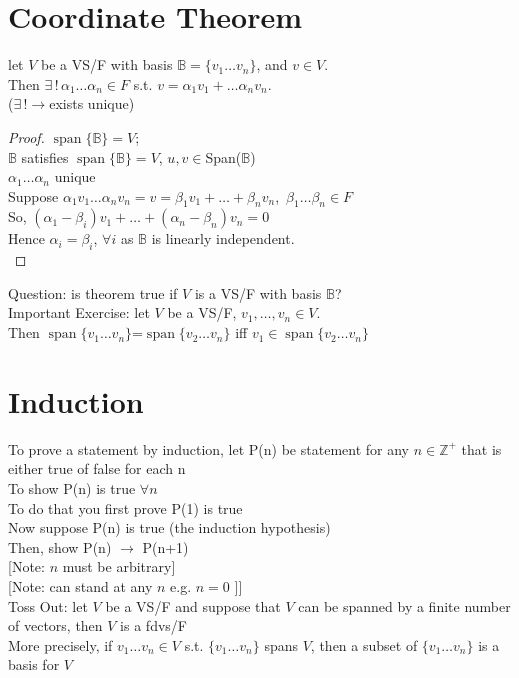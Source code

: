 \documentclass[11pt]{article}
\DeclareMathOperator{\Span}{span}
\begin{document}
\doublespacing
\section*{Coordinate Theorem}
let $V$ be a VS/F with basis $\mathbb{B}=\{v_1\ldots v_n\}$, and $v\in V$. \\
Then $\exists \,! \,{\alpha}_1\ldots {\alpha}_n\in F$ s.t. $v={\alpha}_1v_1+\ldots {\alpha}_nv_n$. \\
($\exists\,!\rightarrow$exists unique)\\
\begin{proof}
$\Span\{\mathbb{B}\}=V$;\\
$\mathbb{B}$ satisfies $\Span\{\mathbb{B} \}=V$, $u, v\in $Span($\mathbb{B}$)\\
$\alpha_1\ldots\alpha_n$ unique\\
Suppose 
${\alpha}_1v_1\ldots {\alpha}_nv_n=v=\beta_1v_1+\ldots+\beta_nv_n$, $\,\beta_1\ldots\beta_n\in F$\\
So, $({\alpha}_1-\beta_i)v_1+\ldots+({\alpha}_n-\beta_n)v_n=0$\\
Hence ${\alpha}_i=\beta_i$, $\forall i$ as $\mathbb{B}$ is linearly independent.\\
\end{proof}

Question: is theorem true if $V$ is a VS/F with basis $\mathbb{B}$?\\
Important Exercise: let $V$ be a VS/F, $v_1,\ldots, v_n\in V$. \\
Then $\Span\{v_1\ldots v_n\}$=$\Span\{v_2\ldots v_n\}$ iff $v_1\in \Span\{v_2\ldots v_n\}$\\

\section*{Induction}
To prove a statement by induction, let P(n) be statement for any $n\in \mathbb{Z}^+$ that is either true of false for each n\\
To show P(n) is true $\forall n$\\
To do that you first prove P(1) is true\\
Now suppose P(n) is true (the induction hypothesis)\\
Then, show P(n) $\rightarrow$ P(n+1)\\
{[}Note: $n$ must be arbitrary{]}\\
{[}Note: can stand at any $n$ e.g. $n=0$ {]}]\\
Toss Out: let $V$ be a VS/F and suppose that $V$ can be spanned by a finite number of vectors, then $V$ is a fdvs/F\\
More precisely, if $v_1\ldots v_n\in V$ s.t. $\{v_1\ldots v_n\}$ spans $V$, then a subset of $\{v_1\ldots v_n\}$ is a basis for $V$\\
\end{document}
